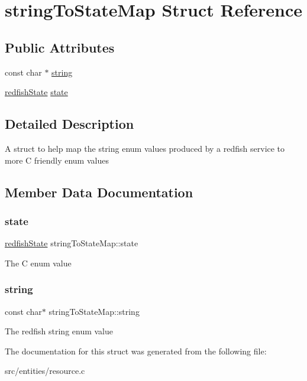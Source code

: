 \hypertarget{structstringToStateMap}{}\section{string\+To\+State\+Map Struct Reference}
\label{structstringToStateMap}
\subsection*{Public Attributes}
\begin{DoxyCompactItemize}
\item 
const char $\ast$ \hyperlink{structstringToStateMap_a037b5490bb4ef6d9e52923b4093b0897}{string}
\item 
\hyperlink{resource_8h_a577a1411db92ef3cec9e1d6b57ecec65}{redfish\+State} \hyperlink{structstringToStateMap_ab22819e2f6fcc1f4a62f98a431d1abd0}{state}
\end{DoxyCompactItemize}


\subsection{Detailed Description}
A struct to help map the string enum values produced by a redfish service to more C friendly enum values 

\subsection{Member Data Documentation}
\mbox{\label{structstringToStateMap_ab22819e2f6fcc1f4a62f98a431d1abd0}} 
\subsubsection{\texorpdfstring{state}{state}}
{\footnotesize\ttfamily \hyperlink{resource_8h_a577a1411db92ef3cec9e1d6b57ecec65}{redfish\+State} string\+To\+State\+Map\+::state}

The C enum value \mbox{\label{structstringToStateMap_a037b5490bb4ef6d9e52923b4093b0897}} 
\subsubsection{\texorpdfstring{string}{string}}
{\footnotesize\ttfamily const char$\ast$ string\+To\+State\+Map\+::string}

The redfish string enum value 

The documentation for this struct was generated from the following file\+:\begin{DoxyCompactItemize}
\item 
src/entities/resource.\+c\end{DoxyCompactItemize}
